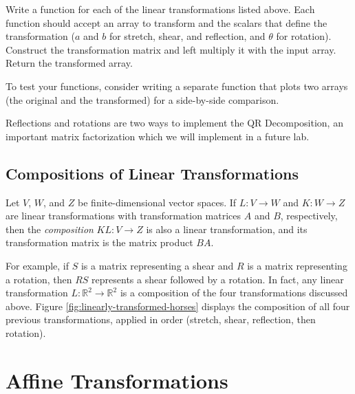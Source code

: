 \begin{problem} %
Write a function for each of the linear transformations listed above.
Each function should accept an array to transform and the scalars that define the transformation ($a$ and $b$ for stretch, shear, and reflection, and $\theta$ for rotation).
Construct the transformation matrix and left multiply it with the input array.
Return the transformed array.

To test your functions, consider writing a separate function that plots two arrays (the original and the transformed) for a side-by-side comparison.
\label{prob:implement-linear-transformations}
\end{problem}

\begin{info} %
Reflections and rotations are two ways to implement the QR Decomposition, an important matrix factorization which we will implement in a future lab. %
\end{info}

\subsection*{Compositions of Linear Transformations} %

Let $V$, $W$, and $Z$ be finite-dimensional vector spaces.
If $L:V\rightarrow W$ and $K:W\rightarrow Z$ are linear transformations with transformation matrices $A$ and $B$, respectively, then the \emph{composition} $KL:V\rightarrow Z$ is also a linear transformation, and its transformation matrix is the matrix product $BA$.

For example, if $S$ is a matrix representing a shear and $R$ is a matrix representing a rotation, then $RS$ represents a shear followed by a rotation.
In fact, any linear transformation $L:\mathbb{R}^2 \rightarrow\mathbb{R}^2$ is a composition of the four transformations discussed above.
Figure \ref{fig:linearly-transformed-horses} displays the composition of all four previous transformations, applied in order (stretch, shear, reflection, then rotation).

\section*{Affine Transformations} %

